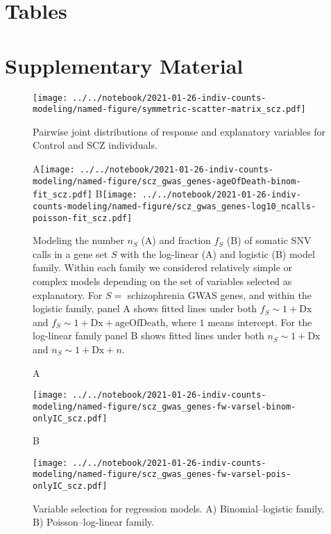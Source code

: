 \documentclass[letterpaper]{article}
\begin{document}
\section*{Tables}

\section*{Supplementary Material}

\setcounter{table}{0}
\makeatletter 
\renewcommand{\figurename}{Supplementary Table} %
\makeatother

\setcounter{figure}{0}
\makeatletter 
\renewcommand{\figurename}{Supplementary Figure} %
\makeatother

\begin{figure}[p]
\begin{center}
\texttt{[image: ../../notebook/2021-01-26-indiv-counts-modeling/named-figure/symmetric-scatter-matrix\_scz.pdf]}
\end{center}
\caption{
Pairwise joint distributions of response and explanatory variables for Control
and SCZ individuals.
}
\label{fig:scattermatrix}
\end{figure}

\begin{figure}[p]
\begin{center}
A\texttt{[image: ../../notebook/2021-01-26-indiv-counts-modeling/named-figure/scz\_gwas\_genes-ageOfDeath-binom-fit\_scz.pdf]}
B\texttt{[image: ../../notebook/2021-01-26-indiv-counts-modeling/named-figure/scz\_gwas\_genes-log10\_ncalls-poisson-fit\_scz.pdf]}
\end{center}
\caption{
Modeling the number $n_S$ (A) and fraction $f_S$ (B) of somatic SNV calls in a
gene set $S$ with the log-linear (A) and logistic (B) model family.  Within
each family we considered relatively simple or complex models depending on the
set of variables selected as explanatory.  For \(S =\) schizophrenia GWAS
genes, and within the logistic family, panel A shows
fitted lines under both \(f_S \sim 1 + \mathrm{Dx}\) and \(f_S \sim 1 +
\mathrm{Dx} + \mathrm{ageOfDeath}\), where \(1\) means intercept.
For the log-linear family panel B shows fitted lines under both \(n_S \sim 1 +
\mathrm{Dx}\) and \(n_S \sim 1 + \mathrm{Dx} + n\).
}
\label{fig:fitted-lines}
\end{figure}

\begin{figure}[p]
\begin{center}
A

\texttt{[image: ../../notebook/2021-01-26-indiv-counts-modeling/named-figure/scz\_gwas\_genes-fw-varsel-binom-onlyIC\_scz.pdf]}

B

\texttt{[image: ../../notebook/2021-01-26-indiv-counts-modeling/named-figure/scz\_gwas\_genes-fw-varsel-pois-onlyIC\_scz.pdf]}
\end{center}
\caption{
Variable selection for regression models. A) Binomial--logistic
family.  B) Poisson--log-linear family.
}
\label{fig:varsel}
\end{figure}
\end{document}
